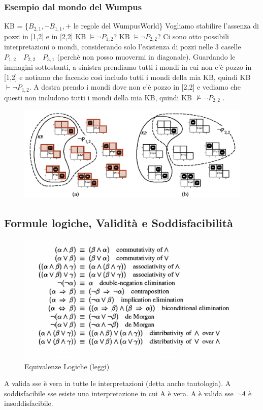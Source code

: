 \documentclass{article}
\begin{document}
\subsubsection{Esempio dal mondo del Wumpus}
KB = \{$B_{2,1}, \neg B_{1,1} , +$ le regole del WumpusWorld\} \newline 
Vogliamo stabilire l’assenza di pozzi in [1,2] e in [2,2] \newline
KB $\models \neg P_{1,2}$? \newline
KB $\models \neg P_{2,2}$? \newline
Ci sono otto possibili interpretazioni o mondi, considerando solo l’esistenza di pozzi nelle 3 caselle $P_{1,2} \quad P_{2,2} \quad P_{3,1}$ (perchè non posso muovermi in diagonale). Guardando le immagini sottostanti, a sinistra prendiamo tutti i mondi in cui non c'è pozzo in [1,2] e notiamo che facendo così includo tutti i mondi della mia KB, quindi KB $\vdash \neg P_{1,2}$. A destra prendo i mondi dove non c'è pozzo in [2,2] e vediamo che questi non includono tutti i mondi della mia KB, quindi KB $\nvDash \neg P_{2,2}$ .
\begin{figure}[H]
\centering
\includegraphics[scale=0.45]{Images/wumpusconslogica.png}
\end{figure}

\subsection{Formule logiche, Validità e Soddisfacibilità}
\begin{figure}[H]
\centering
\includegraphics[scale=0.35]{Images/formulelogiche.png}
\caption{Equivalenze Logiche (leggi)}
\end{figure}
A valida sse è vera in tutte le interpretazioni (detta anche tautologia). \newline
A soddisfacibile sse esiste una interpretazione in cui A è vera. \newline
A è valida sse $\neg A$ è insoddisfacibile.
\end{document}
